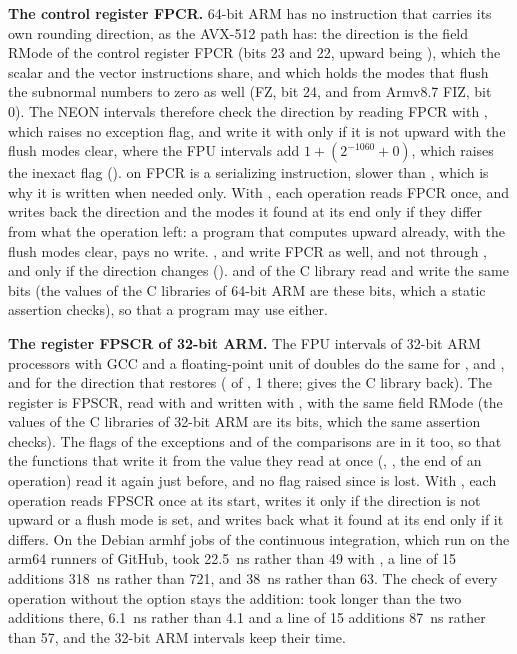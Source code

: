 \documentclass[12pt,a4paper,twoside,openright]{book}
\begin{document}
\medskip
\noindent
\textbf{The control register FPCR.} 64-bit ARM has no instruction that
carries its own rounding direction, as the AVX-512 path has: the direction is
the field RMode of the control register FPCR (bits 23 and 22, upward being
), which the scalar and the vector instructions share, and
which holds the modes that flush the subnormal numbers to zero as well (FZ,
bit 24, and from Armv8.7 FIZ, bit 0). The NEON intervals therefore check the
direction by reading FPCR with , which raises no exception flag, and
write it with  only if it is not upward with the flush modes clear,
where the FPU intervals add $1+(2^{-1060}+0)$, which raises the inexact flag
().  on FPCR is a serializing instruction,
slower than , which is why it is written when needed only. With
, each operation reads FPCR once, and writes
back the direction and the modes it found at its end only if they differ from
what the operation left: a program that computes upward already, with the
flush modes clear, pays no write. ,
 and  write FPCR as well, and
not through , and only if the direction changes
().  and  of the C
library read and write the same bits (the  values of the C
libraries of 64-bit ARM are these bits, which a static assertion checks), so
that a program may use either.

\medskip
\noindent
\textbf{The register FPSCR of 32-bit ARM.} The FPU intervals of 32-bit ARM
processors with GCC and a floating-point unit of doubles do the same for
,  and ,
and for the direction that  restores
( of , 1 there;
 gives the C library back). The register
is FPSCR, read with  and written with , with the same
field RMode (the  values of the C libraries of 32-bit ARM are its
bits, which the same assertion checks). The flags of the exceptions and of
the comparisons are in it too, so that the functions that write it from the
value they read at once (, , the
end of an operation) read it again just before, and no flag raised since is
lost. With , each operation reads FPSCR once
at its start, writes it only if the direction is not upward or a flush mode
is set, and writes back what it found at its end only if it differs. On the
Debian armhf jobs of the continuous integration, which run on the arm64
runners of GitHub,  took 22.5~ns rather than 49 with
, a line of 15 additions 318~ns rather than
721, and  38~ns rather than 63.\newinvfive{} The check of
every operation without the option stays the addition:  took
longer than the two additions there,  6.1~ns rather than 4.1 and
a line of 15 additions 87~ns rather than 57, and the 32-bit ARM intervals
keep their time.
\end{document}
